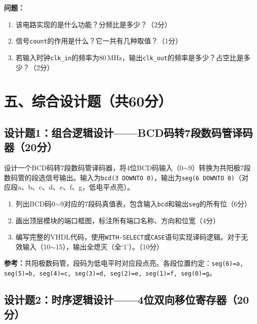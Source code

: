 \begin{framed}
\textbf{问题：}
\begin{enumerate}[label=(\arabic*)]
  \item 该电路实现的是什么功能？分频比是多少？（2分）
  \item 信号\texttt{count}的作用是什么？它一共有几种取值？（1分）
  \item 若输入时钟\texttt{clk\_in}的频率为80\,MHz，输出\texttt{clk\_out}的频率是多少？占空比是多少？（2分）
\end{enumerate}
\end{framed}

\newpage

\section*{五、综合设计题（共60分）}

\subsection*{设计题1：组合逻辑设计——BCD码转7段数码管译码器（20分）}

设计一个BCD码转7段数码管译码器，将4位BCD码输入（0$\sim$9）转换为共阳极7段数码管的段选信号输出。输入为\texttt{bcd(3 DOWNTO 0)}，输出为\texttt{seg(6 DOWNTO 0)}（对应段a、b、c、d、e、f、g，低电平点亮）。

\begin{enumerate}[label=(\arabic*)]
  \item 列出BCD码0$\sim$9对应的7段码真值表，包含输入\texttt{bcd}和输出\texttt{seg}的所有位（6分）
  \item 画出顶层模块的端口框图，标注所有端口名称、方向和位宽（4分）
  \item 编写完整的VHDL代码，使用\texttt{WITH-SELECT}或\texttt{CASE}语句实现译码逻辑。对于无效输入（10$\sim$15），输出全熄灭（全‘1’）。（10分）
\end{enumerate}

\begin{framed}
\textbf{参考：}共阳极数码管，段码为低电平时对应段点亮。各段位置约定：\texttt{seg(6)=a, seg(5)=b, seg(4)=c, seg(3)=d, seg(2)=e, seg(1)=f, seg(0)=g}。
\end{framed}

\newpage

\subsection*{设计题2：时序逻辑设计——4位双向移位寄存器（20分）}

